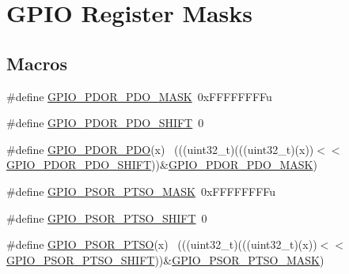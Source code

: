 \hypertarget{group___g_p_i_o___register___masks}{}\section{G\+P\+IO Register Masks}
\label{group___g_p_i_o___register___masks}
\subsection*{Macros}
\begin{DoxyCompactItemize}
\item 
\#define \hyperlink{group___g_p_i_o___register___masks_gafd2a8274691295293b3cabfe86089801}{G\+P\+I\+O\+\_\+\+P\+D\+O\+R\+\_\+\+P\+D\+O\+\_\+\+M\+A\+SK}~0x\+F\+F\+F\+F\+F\+F\+F\+Fu
\item 
\#define \hyperlink{group___g_p_i_o___register___masks_ga495b5f1e63de863534ce0c5f25f137ab}{G\+P\+I\+O\+\_\+\+P\+D\+O\+R\+\_\+\+P\+D\+O\+\_\+\+S\+H\+I\+FT}~0
\item 
\#define \hyperlink{group___g_p_i_o___register___masks_ga79d6ac6995e51c108cc38b287e688f0d}{G\+P\+I\+O\+\_\+\+P\+D\+O\+R\+\_\+\+P\+DO}(x)                                              ~(((uint32\+\_\+t)(((uint32\+\_\+t)(x))$<$$<$\hyperlink{group___g_p_i_o___register___masks_ga495b5f1e63de863534ce0c5f25f137ab}{G\+P\+I\+O\+\_\+\+P\+D\+O\+R\+\_\+\+P\+D\+O\+\_\+\+S\+H\+I\+FT}))\&\hyperlink{group___g_p_i_o___register___masks_gafd2a8274691295293b3cabfe86089801}{G\+P\+I\+O\+\_\+\+P\+D\+O\+R\+\_\+\+P\+D\+O\+\_\+\+M\+A\+SK})
\item 
\#define \hyperlink{group___g_p_i_o___register___masks_gaa8a48e38ef70ff1ba3bbcbf31b891da4}{G\+P\+I\+O\+\_\+\+P\+S\+O\+R\+\_\+\+P\+T\+S\+O\+\_\+\+M\+A\+SK}~0x\+F\+F\+F\+F\+F\+F\+F\+Fu
\item 
\#define \hyperlink{group___g_p_i_o___register___masks_ga5a962b85e07477e26afe639c7ca478cb}{G\+P\+I\+O\+\_\+\+P\+S\+O\+R\+\_\+\+P\+T\+S\+O\+\_\+\+S\+H\+I\+FT}~0
\item 
\#define \hyperlink{group___g_p_i_o___register___masks_gafea75a81df86bdc27b57b045f71a7866}{G\+P\+I\+O\+\_\+\+P\+S\+O\+R\+\_\+\+P\+T\+SO}(x)                                            ~(((uint32\+\_\+t)(((uint32\+\_\+t)(x))$<$$<$\hyperlink{group___g_p_i_o___register___masks_ga5a962b85e07477e26afe639c7ca478cb}{G\+P\+I\+O\+\_\+\+P\+S\+O\+R\+\_\+\+P\+T\+S\+O\+\_\+\+S\+H\+I\+FT}))\&\hyperlink{group___g_p_i_o___register___masks_gaa8a48e38ef70ff1ba3bbcbf31b891da4}{G\+P\+I\+O\+\_\+\+P\+S\+O\+R\+\_\+\+P\+T\+S\+O\+\_\+\+M\+A\+SK})

\end{DoxyCompactItemize}
